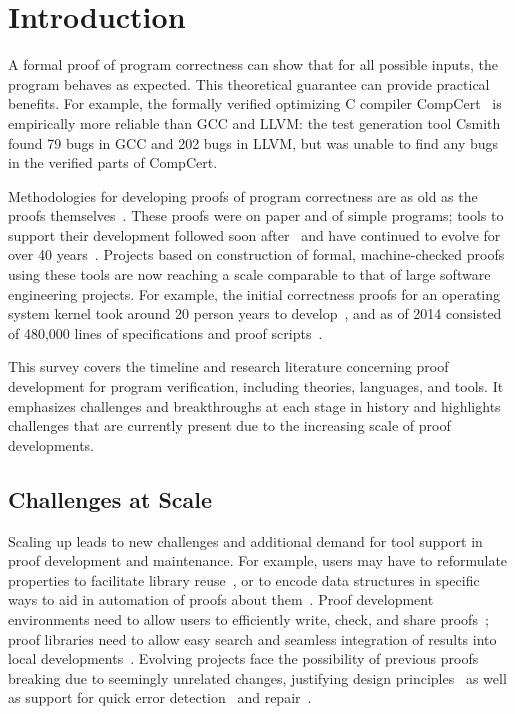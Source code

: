 \chapter{Introduction}
\label{sec:intro}

A formal proof of program correctness can show that for all possible inputs, the program behaves as expected.
This theoretical guarantee can provide practical benefits. For example,
the formally verified optimizing C compiler CompCert~\citep{Leroy:POPL06}
is empirically more reliable than GCC and LLVM:
the test generation tool Csmith~\citep{Yang2011} found 79 bugs in GCC and 202 bugs in LLVM, but was unable to find any bugs
in the verified parts of CompCert. 

Methodologies for developing proofs of program correctness are as old as the proofs themselves~\citep{turing1949, Floyd1967Flowcharts, Hoare1971}.
These proofs were on paper and of simple programs; tools to support their development followed soon after~\citep{Milner1972b}
and have continued to evolve for over 40 years~\citep{Bjoerner2014}.
Projects based on construction of formal, machine-checked proofs using these tools are now reaching a scale comparable to that of large software engineering projects. 
For example, the initial correctness proofs for an operating system kernel took around 20 person years to develop~\citep{Klein2009}, and as of 2014 consisted of 480,000 lines of specifications and proof scripts~\citep{Klein2014micro}.

This survey covers the timeline and research literature concerning proof development for program verification,
including theories, languages, and tools. It emphasizes challenges and breakthroughs at each stage
in history and highlights challenges that are currently present due to the increasing scale of proof developments. 

\section{Challenges at Scale}

Scaling up leads to new challenges and additional demand for tool support in proof development and maintenance. For example, users may
have to reformulate properties to facilitate library reuse~\citep{Hales2017}, or to encode data structures in specific ways to aid in automation
of proofs about them~\citep{Gonthier2008}. Proof development environments need to allow users to efficiently write, check, and share proofs~\citep{Faithfull2016}; proof libraries need to allow easy search and seamless integration of results into local developments~\citep{Gauthier2015}. Evolving projects face the possibility of previous proofs breaking due to seemingly unrelated changes, justifying design principles~\citep{Woos2016} as well as support for quick error detection~\citep{Celik2017} and repair~\citep{Ringer2018}.

